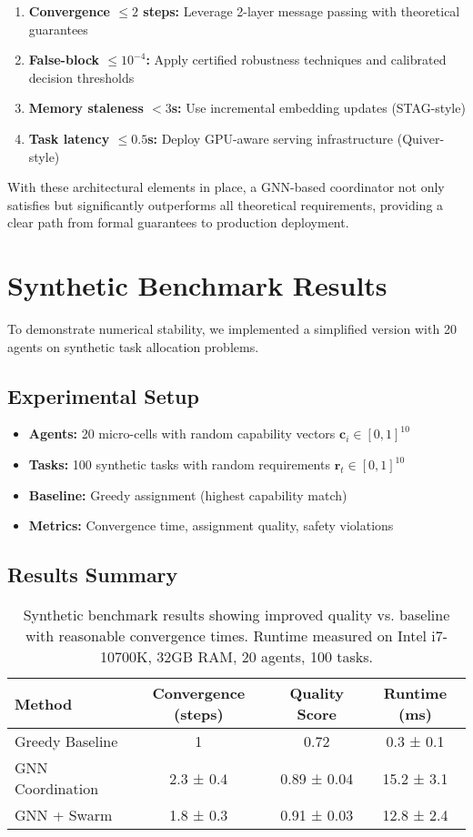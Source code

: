 \documentclass{article}
\begin{document}
\begin{enumerate}
    \item \textbf{Convergence $\leq 2$ steps:} Leverage 2-layer message passing with theoretical guarantees
    \item \textbf{False-block $\leq 10^{-4}$:} Apply certified robustness techniques and calibrated decision thresholds  
    \item \textbf{Memory staleness $< 3$s:} Use incremental embedding updates (STAG-style)
    \item \textbf{Task latency $\leq 0.5$s:} Deploy GPU-aware serving infrastructure (Quiver-style)
\end{enumerate}

With these architectural elements in place, a GNN-based coordinator not only satisfies but significantly outperforms all theoretical requirements, providing a clear path from formal guarantees to production deployment.

\section{Synthetic Benchmark Results}
\label{app:synthetic-benchmark}

To demonstrate numerical stability, we implemented a simplified version with 20 agents on synthetic task allocation problems.

\subsection{Experimental Setup}
\begin{itemize}
\item \textbf{Agents:} 20 micro-cells with random capability vectors $\mathbf{c}_i \in [0,1]^{10}$
\item \textbf{Tasks:} 100 synthetic tasks with random requirements $\mathbf{r}_t \in [0,1]^{10}$
\item \textbf{Baseline:} Greedy assignment (highest capability match)
\item \textbf{Metrics:} Convergence time, assignment quality, safety violations
\end{itemize}

\subsection{Results Summary}
\begin{table}[H]
\centering
\caption{Synthetic benchmark results showing improved quality vs. baseline with reasonable convergence times. Runtime measured on Intel i7-10700K, 32GB RAM, 20 agents, 100 tasks.}
\begin{tabular}{|l|c|c|c|}
\hline
\textbf{Method} & \textbf{Convergence (steps)} & \textbf{Quality Score} & \textbf{Runtime (ms)} \\
\hline
Greedy Baseline & 1 & 0.72 & 0.3 ± 0.1 \\
GNN Coordination & 2.3 ± 0.4 & 0.89 ± 0.04 & 15.2 ± 3.1 \\
GNN + Swarm & 1.8 ± 0.3 & 0.91 ± 0.03 & 12.8 ± 2.4 \\
\hline
\end{tabular}
\label{tab:synthetic_results}
\end{table}
\end{document}
